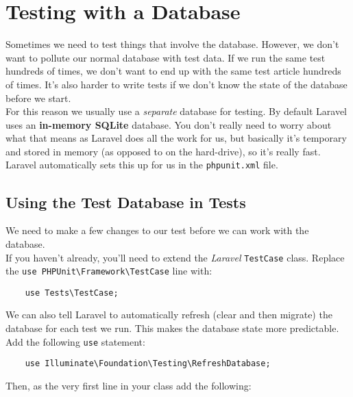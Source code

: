 \section{Testing with a Database}

Sometimes we need to test things that involve the database. However, we don't want to pollute our normal database with test data. If we run the same test hundreds of times, we don't want to end up with the same test article hundreds of times. It's also harder to write tests if we don't know the state of the database before we start.
\\

For this reason we usually use a \textit{separate} database for testing. By default Laravel uses an \textbf{in-memory SQLite} database. You don't really need to worry about what that means as Laravel does all the work for us, but basically it's temporary and stored in memory (as opposed to on the hard-drive), so it's really fast.
\\

Laravel automatically sets this up for us in the \texttt{phpunit.xml} file.


\subsection{Using the Test Database in Tests}

We need to make a few changes to our test before we can work with the database.
\\

If you haven't already, you'll need to extend the \textit{Laravel} \texttt{TestCase} class. Replace the \texttt{use PHPUnit\textbackslash{}Framework\textbackslash{}TestCase} line with:

\begin{verbatim}
    use Tests\TestCase;
\end{verbatim}

We can also tell Laravel to automatically refresh (clear and then migrate) the database for each test we run. This makes the database state more predictable.
\\

Add the following \texttt{use} statement:

\begin{verbatim}
    use Illuminate\Foundation\Testing\RefreshDatabase;
\end{verbatim}

Then, as the very first line in your class add the following:

